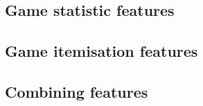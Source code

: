 \documentclass[Report.tex]{subfiles}
\begin{document}
%

\subsection{Game statistic features}

\subsection{Game itemisation features}

\subsection{Combining features}
\end{document}
